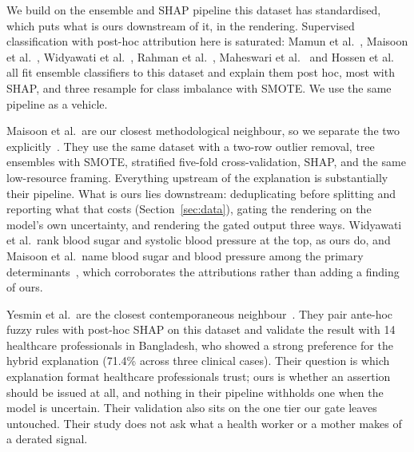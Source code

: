We build on the ensemble and SHAP pipeline this dataset has standardised,
which puts what is ours downstream of it, in the rendering. Supervised classification with post-hoc attribution here is
saturated: Mamun et al.~\citep{mamun2025identification}, Maisoon et
al.~\citep{maisoon2026stratification}, Widyawati et
al.~\citep{widyawati2025ensemble}, Rahman et al.~\citep{rahman2023xai},
Maheswari et al.~\citep{maheswari2024smote} and Hossen et
al.~\citep{hossen2024driven} all fit ensemble classifiers to this dataset and
explain them post hoc, most with SHAP, and three resample for class imbalance
with SMOTE. We use the same pipeline as a vehicle.

Maisoon et al.\ are our closest methodological neighbour, so we separate the
two explicitly~\citep{maisoon2026stratification}. They use the same dataset with
a two-row outlier removal, tree ensembles with SMOTE, stratified
five-fold cross-validation, SHAP, and the same low-resource framing.
Everything upstream of the explanation is substantially their pipeline. What
is ours lies downstream: deduplicating before splitting and reporting what
that costs (Section~\ref{sec:data}), gating the rendering on the model's own
uncertainty, and rendering the gated output three ways. Widyawati
et al.\ rank blood sugar and systolic blood pressure at the top, as ours do,
and Maisoon et al.\ name blood sugar and blood pressure among the primary
determinants~\citep{widyawati2025ensemble,maisoon2026stratification}, which
corroborates the attributions rather than adding a finding of ours.

Yesmin et al.\ are the closest contemporaneous
neighbour~\citep{yesmin2026trust}.
They pair ante-hoc fuzzy rules with post-hoc SHAP on this dataset and
validate the result with 14 healthcare professionals in Bangladesh, who showed
a strong preference for the hybrid explanation (71.4\% across three clinical
cases). Their question is which explanation format healthcare professionals
trust; ours is whether an assertion should be issued at all, and nothing in
their pipeline withholds one when the model is uncertain. Their validation
also sits on the one tier our gate leaves untouched. Their study does not ask
what a health worker or a mother makes of a derated signal.
